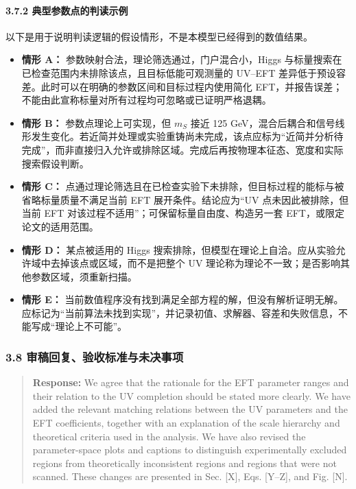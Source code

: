 \documentclass[
  chinese,
  UTF8]{ctexart}
\providecommand{\tightlist}{%
  \setlength{\itemsep}{0pt}\setlength{\parskip}{0pt}}
\begin{document}
\paragraph{3.7.2
典型参数点的判读示例}\label{ux5178ux578bux53c2ux6570ux70b9ux7684ux5224ux8bfbux793aux4f8b}

以下是用于说明判读逻辑的假设情形，不是本模型已经得到的数值结果。

\begin{itemize}
\tightlist
\item
  \textbf{情形 A：} 参数映射合法，理论筛选通过，门户混合小，Higgs
  与标量搜索在已检查范围内未排除该点，且目标低能可观测量的 UV--EFT
  差异低于预设容差。此时可以在明确的参数区间和目标过程内使用简化
  EFT，并报告误差；不能由此宣称标量对所有过程均可忽略或已证明严格退耦。
\item
  \textbf{情形 B：} 参数点理论上可实现，但 \(m_S\) 接近 125
  GeV，混合后耦合和信号线形发生变化。若近简并处理或实验重铸尚未完成，该点应标为``近简并分析待完成''，而非直接归入允许或排除区域。完成后再按物理本征态、宽度和实际搜索假设判断。
\item
  \textbf{情形 C：}
  点通过理论筛选且在已检查实验下未排除，但目标过程的能标与被省略标量质量不满足当前
  EFT 展开条件。结论应为``UV 点未因此被排除，但当前 EFT
  对该过程不适用''；可保留标量自由度、构造另一套
  EFT，或限定论文的适用范围。
\item
  \textbf{情形 D：} 某点被适用的 Higgs
  搜索排除，但模型在理论上自洽。应从实验允许域中去掉该点或区域，而不是把整个
  UV 理论称为理论不一致；是否影响其他参数区域，须重新扫描。
\item
  \textbf{情形 E：}
  当前数值程序没有找到满足全部方程的解，但没有解析证明无解。应标记为``当前算法未找到实现''，并记录初值、求解器、容差和失败信息，不能写成``理论上不可能''。
\end{itemize}

\subsubsection{3.8 审稿回复、验收标准与未决事项}\label{major-2-step-8}

\begin{quote}
\textbf{Response:} We agree that the rationale for the EFT parameter
ranges and their relation to the UV completion should be stated more
clearly. We have added the relevant matching relations between the UV
parameters and the EFT coefficients, together with an explanation of the
scale hierarchy and theoretical criteria used in the analysis. We have
also revised the parameter-space plots and captions to distinguish
experimentally excluded regions from theoretically inconsistent regions
and regions that were not scanned. These changes are presented in Sec.
{[}X{]}, Eqs. {[}Y--Z{]}, and Fig. {[}N{]}.
\end{quote}
\end{document}
